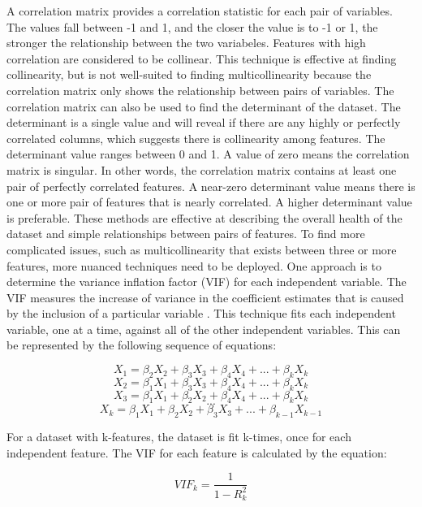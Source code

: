 \documentclass[sigconf]{acmart}
\begin{document}
A correlation matrix provides a correlation statistic for each pair of variables. The values fall between -1 and 1, and the closer the value is to -1 or 1, the stronger the relationship between the two variabeles. Features with high correlation are considered to be collinear. This technique is effective at finding collinearity, but is not well-suited to finding multicollinearity because the correlation matrix only shows the relationship between pairs of variables.  
The correlation matrix can also be used to find the determinant of the dataset. The determinant is a single value and  will reveal if there are any highly or perfectly correlated columns, which suggests there is collinearity among features. The determinant value ranges between 0 and 1. A value of zero means the correlation matrix is singular. In other words, the correlation matrix contains at least one pair of perfectly correlated features. A near-zero determinant value means there is one or more pair of features that is nearly correlated. A higher determinant value is preferable.
These methods are effective at describing the overall health of the dataset and simple relationships between pairs of features. To find more complicated issues, such as multicollinearity that exists between three or more features, more nuanced techniques need to be deployed. One approach is to determine the variance inflation factor (VIF) for each independent variable. The VIF measures the increase of variance in the coefficient estimates that is caused by the inclusion of a particular variable \cite{cite15}. This technique fits each independent variable, one at a time, against all of the other independent variables. This can be represented by the following sequence of equations:

\[X_1 = \beta_2X_2 + \beta_3X_3 + \beta_4X_4 + ... + \beta_kX_k \]
\[X_2 = \beta_1X_1 + \beta_3X_3 + \beta_4X_4 + ... + \beta_kX_k \]
\[X_3 = \beta_1X_1 + \beta_2X_2 + \beta_4X_4 + ... + \beta_kX_k \]
\[...\]
\[X_k = \beta_1X_1 + \beta_2X_2 + \beta_3X_3 + ... + \beta_{k-1}X_{k-1} \]

For a dataset with k-features, the dataset is fit k-times, once for each independent feature. The VIF for each feature is calculated by the equation:

\[ VIF_k =\frac{1}{1 - R^2_k}\]
\end{document}
